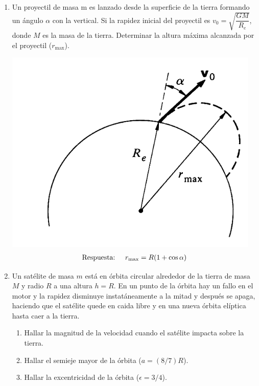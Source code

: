 \documentclass[11pt,twocolumn]{article}
\begin{document}
\begin{enumerate}
\item Un proyectil de masa m es lanzado desde la superficie de la tierra formando un  ángulo $\alpha$ con la vertical. Si la rapidez inicial del proyectil es $v_0=\sqrt{\dfrac{GM}{R_e}}$, donde $M$ es la masa de la tierra. Determinar la altura máxima alcanzada por el proyectil ($r_{\text{max}}$).

\includegraphics[scale=0.3]{tiro}
\begin{align*}
\text{Respuesta:}\hspace{0.5 cm} r_{\text{max}}=R(1+\cos\alpha)
\end{align*}

\item Un satélite de masa $m$ está en órbita circular alrededor de la tierra de masa $M$ y radio $R$ a una altura $h=R$. En un punto de la órbita hay un fallo en el motor y la rapidez disminuye instatáneamente a la mitad y después se apaga, haciendo que el satélite quede en caida libre y en una nueva órbita elíptica hasta caer a la tierra.
\begin{enumerate}
\item Hallar la magnitud de la velocidad cuando el satélite impacta sobre la tierra.
\item Hallar el semieje mayor de la órbita ($a=(8/7)R$).
\item Hallar la excentricidad de la órbita ($\epsilon=3/4$).
\end{enumerate}


\end{enumerate}
\end{document}
